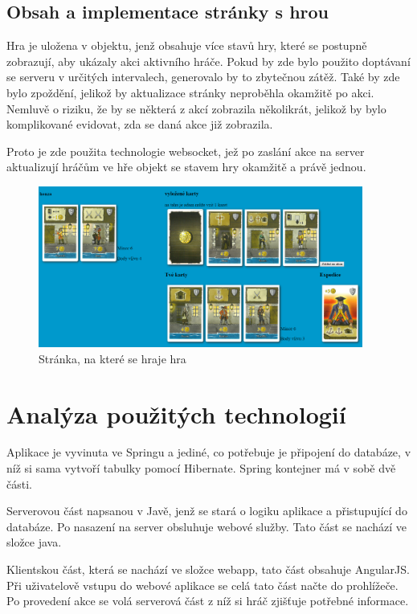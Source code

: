 \documentclass[czech,master,public,dept460,male,cpdeclaration,twoside]{diploma}
\begin{document}
\subsection{Obsah a implementace stránky s hrou}
Hra je uložena v objektu, jenž obsahuje více stavů hry, které se postupně zobrazují, aby ukázaly akci aktivního hráče.
Pokud by zde bylo použito doptávaní se serveru v určitých intervalech, generovalo by to zbytečnou zátěž. Také by zde bylo zpoždění, jelikož by aktualizace stránky neproběhla okamžitě po akci. Nemluvě o riziku, že by se některá z akcí zobrazila několikrát, jelikož by bylo komplikované evidovat, zda se daná akce již zobrazila.

Proto je zde použita technologie websocket, jež po zaslání akce na server aktualizují hráčům ve hře objekt se stavem hry okamžitě a právě jednou.
\begin{figure}[H]
\centering\includegraphics[width=0.95\textwidth]{Figures/gamepage.png}\caption{Stránka, na které se hraje hra}
\end{figure}


\section{Analýza použitých technologií}
Aplikace je vyvinuta ve Springu a jediné, co potřebuje je připojení do databáze, v níž si sama vytvoří tabulky pomocí Hibernate. Spring kontejner má v sobě dvě části.

Serverovou část napsanou v Javě, jenž se stará o logiku aplikace a přistupující do databáze. Po nasazení na server obsluhuje webové služby. Tato část se nachází ve složce java. 

Klientskou část, která se nachází ve složce webapp, tato část obsahuje AngularJS. Při uživatelově vstupu do webové aplikace se celá tato část načte do prohlížeče. Po provedení akce se volá serverová část z níž si hráč zjišťuje potřebné informace.
\end{document}
